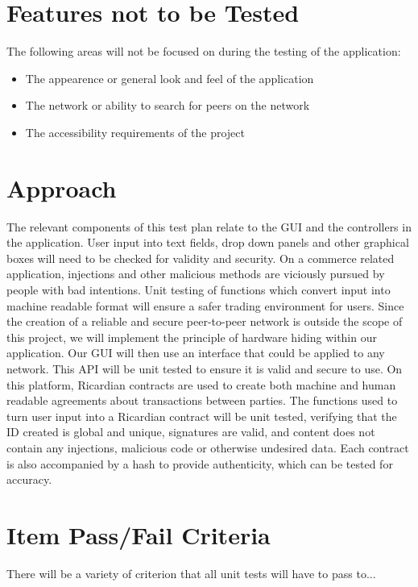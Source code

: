 \documentclass{article}
\begin{document}
\section*{Features not to be Tested}
The following areas will not be focused on during the testing of the application:
\newline
\begin{itemize}
 \item
The appearence or general look and feel of the application
 \item
The network or ability to search for peers on the network
\item
The accessibility requirements of the project
\end{itemize}

\section*{Approach}
The relevant components of this test plan relate to the GUI and the controllers in the application. User input into text fields, drop down panels and other graphical boxes will need to be checked for validity and security. On a commerce related application, injections and other malicious methods are viciously pursued by people with bad intentions. Unit testing of functions which convert input into machine readable format will ensure a safer trading environment for users. Since the creation of a reliable and secure peer-to-peer network is outside the scope of this project, we will implement the principle of hardware hiding within our application. Our GUI will then use an interface that could be applied to any network. This API will be unit tested to ensure it is valid and secure to use. On this platform, Ricardian contracts are used to create both machine and human readable agreements about transactions between parties. The functions used to turn user input into a Ricardian contract will be unit tested, verifying that the ID created is global and unique, signatures are valid, and content does not contain any injections, malicious code or otherwise undesired data. Each contract is also accompanied by a hash to provide authenticity, which can be tested for accuracy.

\section*{Item Pass/Fail Criteria}
There will be a variety of criterion that all unit tests will have to pass to...
\end{document}
